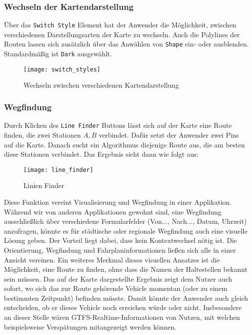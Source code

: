   \subsubsection*{Wechseln der Kartendarstellung}
  \label{ssub:style_auswahl}
    Über das \texttt{Switch Style} Element {\Large {}} hat der Anwender die Möglichkeit, zwischen verschiedenen Darstellungsarten der Karte zu wechseln. Auch die Polylines der Routen lassen sich zusätzlich über das Anwählen von \texttt{Shape} ein- oder ausblenden. Standardmäßig ist \texttt{Dark} ausgewählt.

    \begin{figure}[htbp]
      \begin{center}
        \texttt{[image: switch\_styles]}
        \caption{Wechseln zwischen verschiedenen Kartendarstellung}
        \label{fig:switch_styles}
      \end{center}
    \end{figure}
    

  \subsubsection*{Wegfindung}
  \label{ssub:wegfindung}
    Durch Klicken des \texttt{Line Finder} Buttons {\Large {}} lässt sich auf der Karte eine Route finden, die zwei Stationen $A, B$ verbindet. Dafür setzt der Anwender zwei Pins auf die Karte. Danach sucht ein Algorithmus diejenige Route aus, die am besten diese Stationen verbindet. Das Ergebnis sieht dann wie folgt aus:

    \begin{figure}[htbp]
      \begin{center}
        \texttt{[image: line\_finder]}
        \caption{Linien Finder}
        \label{fig:line_finder}
      \end{center}
    \end{figure}

    Diese Funktion vereint Visualisierung und Wegfindung in einer Applikation. Während wir von anderen Applikationen gewohnt sind, eine Wegfindung ausschließlich über verschiedene Formularfelder (Von..., Nach..., Datum, Uhrzeit) anzufragen, könnte es für städtische oder regionale Wegfindung auch eine visuelle Lösung geben. Der Vorteil liegt dabei, dass kein Kontextwechsel nötig ist. Die Orientierung, Wegfindung und Fahrplaninformationen ließen sich alle in einer Ansicht vereinen. Ein weiteres Merkmal dieses visuellen Ansatzes ist die Möglichkeit, eine Route zu finden, ohne dass die Namen der Haltestellen bekannt sein müssen. Das auf der Karte dargestellte Ergebnis zeigt dem Nutzer auch sofort, wo sich das zur Route gehörende Vehicle momentan (oder zu einem bestimmten Zeitpunkt) befinden müsste. Damit könnte der Anwender auch gleich entscheiden, ob er dieses Vehicle noch erreichen würde oder nicht. Insbesondere an dieser Stelle wären GTFS-Realtime-Informationen von Nutzen, mit welchen beispielsweise Verspätungen mitangezeigt werden können.\\

